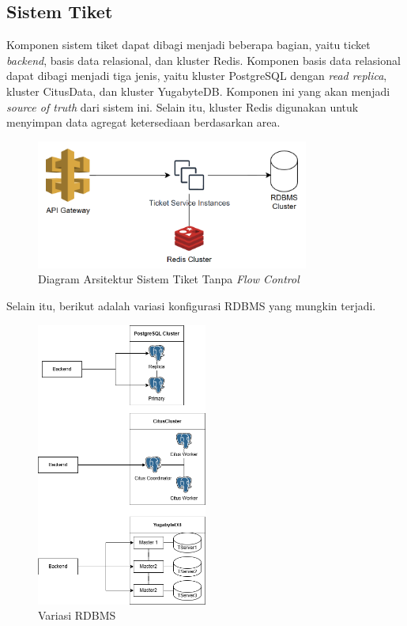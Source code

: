 \subsection{Sistem Tiket}

Komponen sistem tiket dapat dibagi menjadi beberapa bagian, yaitu ticket \textit{backend}, basis data relasional, dan kluster Redis. Komponen basis data relasional dapat dibagi menjadi tiga jenis, yaitu kluster PostgreSQL dengan \textit{read replica}, kluster CitusData, dan kluster YugabyteDB. Komponen ini yang akan menjadi \textit{source of truth} dari sistem ini. Selain itu, kluster Redis digunakan untuk menyimpan data agregat ketersediaan berdasarkan area.

\begin{figure}[htbp]
    \centering
    \includegraphics[width=0.8\textwidth]{resources/chapter-3/ticket-nofc.png}
    \caption{Diagram Arsitektur Sistem Tiket Tanpa \textit{Flow Control}}
    \label{fig:ticket-nofc}
\end{figure}

\pagebreak

Selain itu, berikut adalah variasi konfigurasi RDBMS yang mungkin terjadi.

\begin{figure}[htbp]
    \centering
    \includegraphics[width=0.5\textwidth]{resources/chapter-3/rdbms.png}
    \caption{Variasi RDBMS}
    \label{fig:rdbms-variation}
\end{figure}

